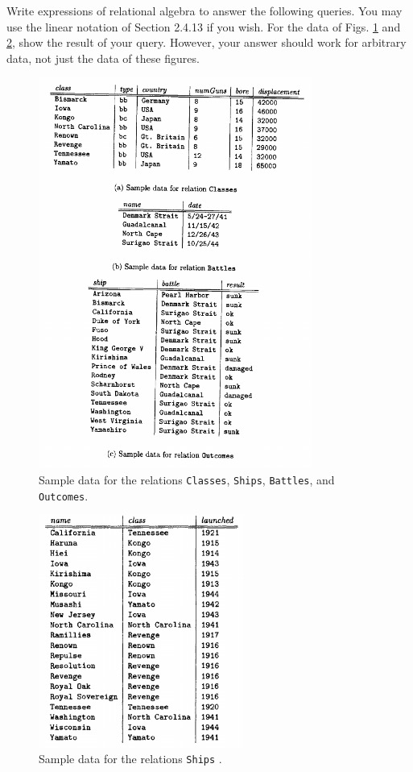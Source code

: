 \documentclass{cshwk}
\begin{document}
Write expressions of relational algebra to answer the following queries. You may use the linear notation of Section 2.4.13 if you wish. For the data of Figs. \ref{fig:sample-data-table1} and \ref{fig:sample-data-table2}, show the result of your query. However, your answer should work for arbitrary data, not just the data of these figures.
\begin{figure}[htbp]
    \centering
    \includegraphics[width=0.8\textwidth]{hw3-3.png}
    \caption{Sample data for the relations \texttt{Classes}, \texttt{Ships}, \texttt{Battles}, and \texttt{Outcomes}.}
    \label{fig:sample-data-table1}
\end{figure}

\begin{figure}[htbp]
    \centering
    \includegraphics[width=0.6\textwidth]{hw3-4.png}
    \caption{Sample data for the relations \texttt{Ships} .}
    \label{fig:sample-data-table2}
\end{figure}
\end{document}
